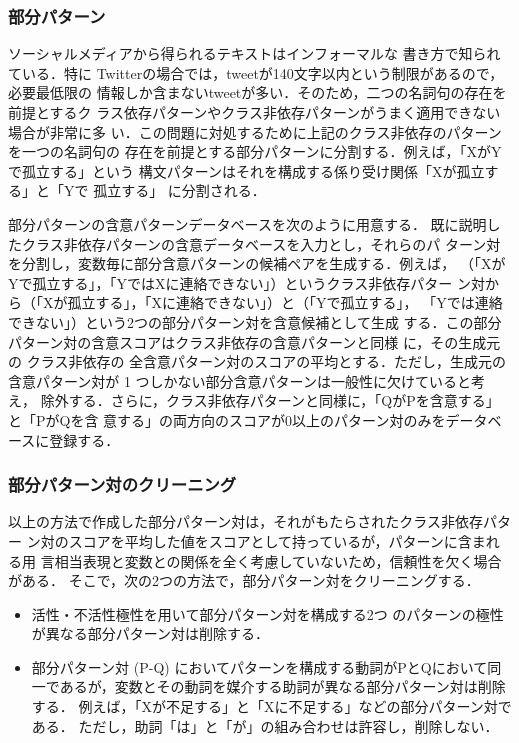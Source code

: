 \documentclass[japanese]{jnlp_1.4}
\begin{document}
\subsubsection{部分パターン}

ソーシャルメディアから得られるテキストはインフォーマルな
書き方で知られている．特に
Twitterの場合では，tweetが140文字以内という制限があるので，必要最低限の
情報しか含まないtweetが多い．そのため，二つの名詞句の存在を前提とするク
ラス依存パターンやクラス非依存パターンがうまく適用できない場合が非常に多
い．この問題に対処するために上記のクラス非依存のパターンを一つの名詞句の
存在を前提とする部分パターンに分割する．例えば，「XがYで孤立する」という
構文パターンはそれを構成する係り受け関係「Xが孤立する」と「Yで 孤立する」
に分割される．

部分パターンの含意パターンデータベースを次のように用意する．
既に説明したクラス非依存パターンの含意データベースを入力とし，それらのパ
ターン対を分割し，変数毎に部分含意パターンの候補ペアを生成する．例えば，
（「XがYで孤立する」，「YではXに連絡できない」）というクラス非依存パター
ン対から（「Xが孤立する」，「Xに連絡できない」）と（「Yで孤立する」，
「Yでは連絡できない」）という2つの部分パターン対を含意候補として生成
する．この部分パターン対の含意スコアはクラス非依存の含意パターンと同様
に，その生成元の
 クラス非依存の
全含意パターン対のスコアの平均とする．ただし，生成元の
含意パターン対が 1 つしかない部分含意パターンは一般性に欠けていると考え，
除外する．さらに，クラス非依存パターンと同様に，「QがPを含意する」と「PがQを含
意する」の両方向のスコアが0以上のパターン対のみをデータベースに登録する．


\subsubsection{部分パターン対のクリーニング}

以上の方法で作成した部分パターン対は，それがもたらされたクラス非依存パター
ン対のスコアを平均した値をスコアとして持っているが，パターンに含まれる用
言相当表現と変数との関係を全く考慮していないため，信頼性を欠く場合がある．
そこで，次の2つの方法で，部分パターン対をクリーニングする．
\begin{itemize}
 \item 活性・不活性極性\cite{Hashimoto2012}を用いて部分パターン対を構成する2つ
のパターンの極性が異なる部分パターン対は削除する．
 \item 部分パターン対 (P-Q) においてパターンを構成する動詞がPとQにおいて同
一であるが，変数とその動詞を媒介する助詞が異なる部分パターン対は削除する．
例えば，「Xが不足する」と「Xに不足する」などの部分パターン対である．
ただし，助詞「は」と「が」の組み合わせは許容し，削除しない．
\end{itemize}
\end{document}
